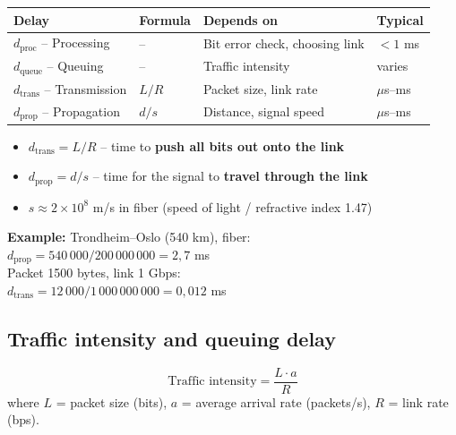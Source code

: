 \begin{center}
\begin{tabular}{llll}
\toprule
\textbf{Delay} & \textbf{Formula} & \textbf{Depends on} & \textbf{Typical} \\
\midrule
$d_{\text{proc}}$ -- Processing & -- & Bit error check, choosing link & $< 1$ ms \\
$d_{\text{queue}}$ -- Queuing & -- & Traffic intensity & varies \\
$d_{\text{trans}}$ -- Transmission & $L/R$ & Packet size, link rate & $\mu$s--ms \\
$d_{\text{prop}}$ -- Propagation & $d/s$ & Distance, signal speed & $\mu$s--ms \\
\bottomrule
\end{tabular}
\end{center}

\begin{warnbox}
\begin{itemize}[noitemsep]
    \item $d_{\text{trans}} = L/R$ -- time to \textbf{push all bits out onto the link}
    \item $d_{\text{prop}} = d/s$ -- time for the signal to \textbf{travel through the link}
    \item $s \approx 2 \times 10^8$ m/s in fiber (speed of light / refractive index 1.47)
\end{itemize}
\textbf{Example:} Trondheim--Oslo (540 km), fiber:\\
$d_{\text{prop}} = 540\,000 / 200\,000\,000 = 2{,}7$ ms\\
Packet 1500 bytes, link 1 Gbps:\\
$d_{\text{trans}} = 12\,000 / 1\,000\,000\,000 = 0{,}012$ ms
\end{warnbox}

\begin{imagebox}
\end{imagebox}

\subsection{Traffic intensity and queuing delay}

\begin{formulabox}
\[
\text{Traffic intensity} = \frac{L \cdot a}{R}
\]
where $L$ = packet size (bits), $a$ = average arrival rate (packets/s), $R$ = link rate (bps).
\end{formulabox}

